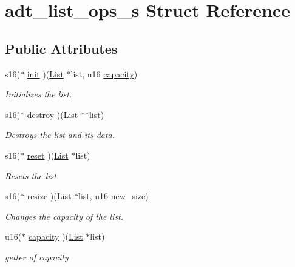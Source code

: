\hypertarget{structadt__list__ops__s}{}\section{adt\+\_\+list\+\_\+ops\+\_\+s Struct Reference}
\label{structadt__list__ops__s}
\subsection*{Public Attributes}
\begin{DoxyCompactItemize}
\item 
s16($\ast$ \hyperlink{structadt__list__ops__s_a7085f5015cf3ef89ede1dafa610d8513}{init} )(\hyperlink{structadt__list__s}{List} $\ast$list, u16 \hyperlink{structadt__list__ops__s_a739fb8b630a36bcffd0182c82b6eaa9a}{capacity})
\begin{DoxyCompactList}\small\item\em Initializes the list. \end{DoxyCompactList}\item 
s16($\ast$ \hyperlink{structadt__list__ops__s_a946d68604826841c974d4a686973934c}{destroy} )(\hyperlink{structadt__list__s}{List} $\ast$$\ast$list)
\begin{DoxyCompactList}\small\item\em Destroys the list and it\textquotesingle{}s data. \end{DoxyCompactList}\item 
s16($\ast$ \hyperlink{structadt__list__ops__s_a3160882c20d8d31c006da0d9908a6931}{reset} )(\hyperlink{structadt__list__s}{List} $\ast$list)
\begin{DoxyCompactList}\small\item\em Resets the list. \end{DoxyCompactList}\item 
s16($\ast$ \hyperlink{structadt__list__ops__s_acdcd86caebe642ecbe5abb61cde2d896}{resize} )(\hyperlink{structadt__list__s}{List} $\ast$list, u16 new\+\_\+size)
\begin{DoxyCompactList}\small\item\em Changes the capacity of the list. \end{DoxyCompactList}\item 
u16($\ast$ \hyperlink{structadt__list__ops__s_a739fb8b630a36bcffd0182c82b6eaa9a}{capacity} )(\hyperlink{structadt__list__s}{List} $\ast$list)
\begin{DoxyCompactList}\small\item\em getter of capacity \end{DoxyCompactList}\item 
$$
\end{DoxyCompactItemize}

